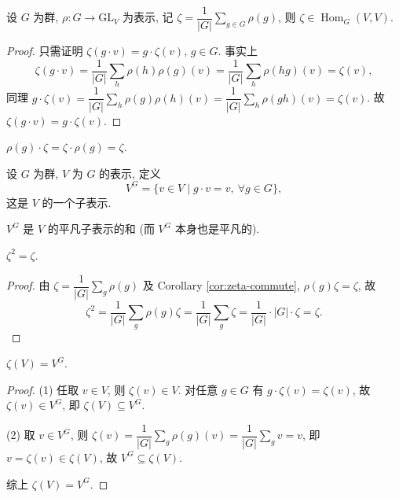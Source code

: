 \begin{lemma}\label{lem:averaging}
设 $G$ 为群, $\rho\colon G\to\mathrm{GL}_V$ 为表示, 记
$\zeta=\dfrac{1}{|G|}\sum_{g\in G}\rho(g)$, 则 $\zeta\in\operatorname{Hom}_G(V,V)$.
\end{lemma}

\begin{proof}
只需证明 $\zeta(g\cdot v)=g\cdot\zeta(v)$, $g\in G$. 事实上
\[
  \zeta(g\cdot v)=\frac{1}{|G|}\sum_{h}\rho(h)\rho(g)(v)
  =\frac{1}{|G|}\sum_{h}\rho(hg)(v)=\zeta(v),
\]
同理 $g\cdot\zeta(v)=\dfrac{1}{|G|}\sum_{h}\rho(g)\rho(h)(v)
=\dfrac{1}{|G|}\sum_{h}\rho(gh)(v)=\zeta(v)$. 故 $\zeta(g\cdot v)=g\cdot\zeta(v)$.
\end{proof}

\begin{corollary}\label{cor:zeta-commute}
$\rho(g)\cdot\zeta=\zeta\cdot\rho(g)=\zeta$.
\end{corollary}

\begin{definition}\label{def:invariants}
设 $G$ 为群, $V$ 为 $G$ 的表示, 定义
\[
  V^G=\{v\in V\mid g\cdot v=v,\ \forall g\in G\},
\]
这是 $V$ 的一个子表示.
\end{definition}

\begin{remark}\label{rem:invariants-trivial}
$V^G$ 是 $V$ 的平凡子表示的和 (而 $V^G$ 本身也是平凡的).
\end{remark}

\begin{lemma}\label{lem:zeta-idempotent}
$\zeta^2=\zeta$.
\end{lemma}

\begin{proof}
由 $\zeta=\dfrac{1}{|G|}\sum_{g}\rho(g)$ 及 Corollary \ref{cor:zeta-commute},
$\rho(g)\zeta=\zeta$, 故
\[
  \zeta^2=\frac{1}{|G|}\sum_{g}\rho(g)\zeta=\frac{1}{|G|}\sum_{g}\zeta
  =\frac{1}{|G|}\cdot|G|\cdot\zeta=\zeta .
\]
\end{proof}

\begin{lemma}\label{lem:zeta-image}
$\zeta(V)=V^G$.
\end{lemma}

\begin{proof}
\mbox{}\par\vspace{-0.2em}
(1) 任取 $v\in V$, 则 $\zeta(v)\in V$. 对任意 $g\in G$ 有 $g\cdot\zeta(v)=\zeta(v)$,
故 $\zeta(v)\in V^G$, 即 $\zeta(V)\subseteq V^G$.

(2) 取 $v\in V^G$, 则
$\zeta(v)=\dfrac{1}{|G|}\sum_{g}\rho(g)(v)=\dfrac{1}{|G|}\sum_{g}v=v$,
即 $v=\zeta(v)\in\zeta(V)$, 故 $V^G\subseteq\zeta(V)$.

综上 $\zeta(V)=V^G$.
\end{proof}

